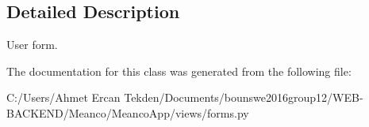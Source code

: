 \subsection{Detailed Description}
User form. 

The documentation for this class was generated from the following file\+:\begin{DoxyCompactItemize}
\item 
C\+:/\+Users/\+Ahmet Ercan Tekden/\+Documents/bounswe2016group12/\+W\+E\+B-\/\+B\+A\+C\+K\+E\+N\+D/\+Meanco/\+Meanco\+App/views/forms.\+py\end{DoxyCompactItemize}

